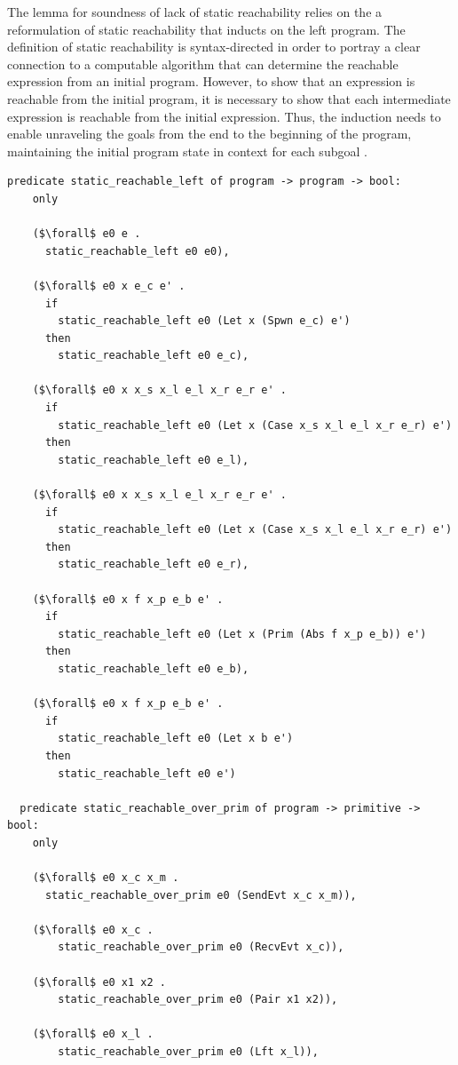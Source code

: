 \documentclass{article}
\begin{document}
The lemma for soundness of lack of static reachability relies on the a reformulation of
static reachability that inducts on the left program.
The definition of static reachability is syntax-directed in
order to portray a clear connection to
a computable algorithm that can determine the reachable expression from an initial program.
However, to show that an expression is reachable from the initial program, it is necessary to
show that each intermediate expression is reachable from the initial expression.  Thus, the
induction needs to enable unraveling the goals from the end to the beginning of the program,
maintaining the initial program state in context for each subgoal .

\begin{lstlisting}[language=logic, mathescape]
  predicate static_reachable_left of program -> program -> bool:
    only

    ($\forall$ e0 e .
      static_reachable_left e0 e0),

    ($\forall$ e0 x e_c e' .
      if 
        static_reachable_left e0 (Let x (Spwn e_c) e')
      then
        static_reachable_left e0 e_c),

    ($\forall$ e0 x x_s x_l e_l x_r e_r e' .
      if
        static_reachable_left e0 (Let x (Case x_s x_l e_l x_r e_r) e')
      then
        static_reachable_left e0 e_l),

    ($\forall$ e0 x x_s x_l e_l x_r e_r e' .
      if
        static_reachable_left e0 (Let x (Case x_s x_l e_l x_r e_r) e')
      then
        static_reachable_left e0 e_r),

    ($\forall$ e0 x f x_p e_b e' .
      if
        static_reachable_left e0 (Let x (Prim (Abs f x_p e_b)) e')
      then
        static_reachable_left e0 e_b),

    ($\forall$ e0 x f x_p e_b e' .
      if
        static_reachable_left e0 (Let x b e')
      then
        static_reachable_left e0 e')

  predicate static_reachable_over_prim of program -> primitive -> bool:
    only

    ($\forall$ e0 x_c x_m .
      static_reachable_over_prim e0 (SendEvt x_c x_m)),

    ($\forall$ e0 x_c .
        static_reachable_over_prim e0 (RecvEvt x_c)),

    ($\forall$ e0 x1 x2 .
        static_reachable_over_prim e0 (Pair x1 x2)),

    ($\forall$ e0 x_l .
        static_reachable_over_prim e0 (Lft x_l)),


\end{lstlisting}
\end{document}
